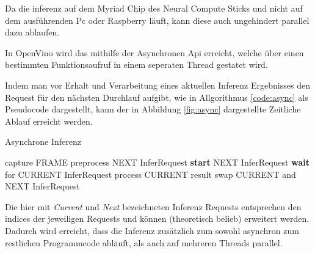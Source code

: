 Da die inferenz auf dem Myriad Chip des Neural Compute Sticks
und nicht auf dem ausführenden Pc oder Raspberry läuft,
kann diese auch ungehindert parallel dazu ablaufen.

In OpenVino wird das mithilfe der Asynchronen Api erreicht, welche 
über einen bestimmten Funktionsaufruf in einem seperaten 
Thread gestatet wird.



Indem man vor Erhalt und Verarbeitung eines aktuellen 
Inferenz Ergebnisses den Request für den nächsten Durchlauf aufgibt, 
wie in Allgorithmus \ref{code:async} als Pseudocode dargestellt, 
kann der in Abbildung \ref{fig:async} dargestellte Zeitliche 
Ablauf erreicht werden.



\vspace{1cm}
\begin{minipage}{0.1\textwidth}
  \hfill
\end{minipage}
\begin{minipage}{0.5\textwidth}
  \begin{algorithm}[H]
    \caption{Asynchrone Inferenz}
    \label{code:async}
    \begin{algorithmic}
    \WHILE{\TRUE}
        \STATE capture FRAME
        \STATE preprocess NEXT InferRequest
        \STATE \textbf{start} NEXT InferRequest
          \STATE \textbf{wait} for CURRENT InferRequest
          \STATE process CURRENT result
          \STATE swap CURRENT and NEXT InferRequest
    \ENDWHILE
    \end{algorithmic}
  \end{algorithm}
\end{minipage}
\begin{minipage}{0.4\textwidth}
  \centering
  \vspace{1cm}
  \def\svgwidth{0.5\textwidth}
  
\end{minipage}

\vspace{1cm}

\begin{figure}[H]
  \centering
  \def\svgwidth{0.9\textwidth}
  
  \caption{}
  \label{fig:}
\end{figure}

Die hier mit \textit{Current} und \textit{Next} bezeichneten 
Inferenz Requests entsprechen den indices der jeweiligen Requests
und können (theoretisch belieb) erweitert werden. Dadurch
wird erreicht, dass die Inferenz zusätzlich zum  sowohl asynchron zum 
restlichen Programmcode abläuft, als auch auf mehreren Threads 
parallel.

